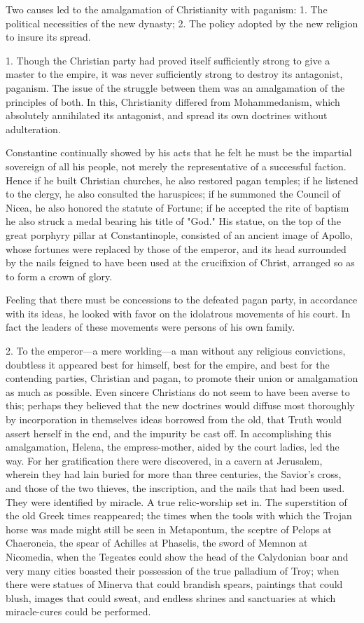 Two causes led to the amalgamation of Christianity with paganism: 1. The political
necessities of the new dynasty; 2. The policy adopted by the new religion to insure its spread.

1. Though the Christian party had proved itself sufficiently strong to give a master to the
empire, it was never sufficiently strong to destroy its antagonist, paganism. The issue of the
struggle between them was an amalgamation of the principles of both. In this, Christianity
differed from Mohammedanism, which absolutely annihilated its antagonist, and spread its
own doctrines without adulteration.

Constantine continually showed by his acts that he felt he must be the impartial sovereign of
all his people, not merely the representative of a successful faction. Hence if he built
Christian churches, he also restored pagan temples; if he listened to the clergy, he also
consulted the haruspices; if he summoned the Council of Nicea, he also honored the statute
of Fortune; if he accepted the rite of baptism he also struck a medal bearing his title of
"God." His statue, on the top of the great porphyry pillar at Constantinople, consisted of an
ancient image of Apollo, whose fortunes were replaced by those of the emperor, and its head
surrounded by the nails feigned to have been used at the crucifixion of Christ, arranged so as
to form a crown of glory.

Feeling that there must be concessions to the defeated pagan party, in accordance with its
ideas, he looked with favor on the idolatrous movements of his court. In fact the leaders of
these movements were persons of his own family.

2. To the emperor—a mere worlding—a man without any religious convictions, doubtless it
appeared best for himself, best for the empire, and best for the contending parties, Christian
and pagan, to promote their union or amalgamation as much as possible. Even sincere
Christians do not seem to have been averse to this; perhaps they believed that the new
doctrines would diffuse most thoroughly by incorporation in themselves ideas borrowed from
the old, that Truth would assert herself in the end, and the impurity be cast off. In
accomplishing this amalgamation, Helena, the empress-mother, aided by the court ladies, led
the way. For her gratification there were discovered, in a cavern at Jerusalem, wherein they
had lain buried for more than three centuries, the Savior's cross, and those of the two thieves,
the inscription, and the nails that had been used. They were identified by miracle. A true
relic-worship set in. The superstition of the old Greek times reappeared; the times when the
tools with which the Trojan horse was made might still be seen in Metapontum, the sceptre
of Pelops at Chaeroneia, the spear of Achilles at Phaselis, the sword of Memnon at
Nicomedia, when the Tegeates could show the head of the Calydonian boar and very many
cities boasted their possession of the true palladium of Troy; when there were statues of
Minerva that could brandish spears, paintings that could blush, images that could sweat, and
endless shrines and sanctuaries at which miracle-cures could be performed.

